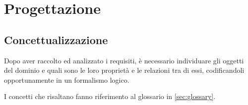 \chapter{Progettazione}

\section{Concettualizzazione}
Dopo aver raccolto ed analizzato i requisiti, è necessario individuare gli oggetti del dominio e quali sono le loro proprietà e le relazioni tra di essi, codificandoli opportunamente in un formalismo logico.

I concetti che risaltano fanno riferimento al glossario in \ref{sec:glossary}.





